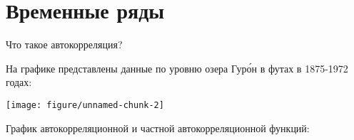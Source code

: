 \chapter{Временные ряды}


\begin{problem}
Что такое автокорреляция?
\end{problem}

\begin{solution}
\end{solution}


\begin{problem}
На графике представлены данные по уровню озера Гур\'{о}н в футах в 1875-1972 годах:  




\begin{knitrout}
\color{fgcolor}\begin{kframe}
\begin{alltt}
 \hlstd{(}    \hlopt{+} \hlstd{()} \hlopt{+} \hlstd{(} \hlstd{=} \hlstd{,}
     \hlstd{=} \hlstd{)}
\end{alltt}
\end{kframe}
\texttt{[image: figure/unnamed-chunk-2]} 

\end{knitrout}


График автокорреляционной и частной автокорреляционной функций:


\end{problem}
